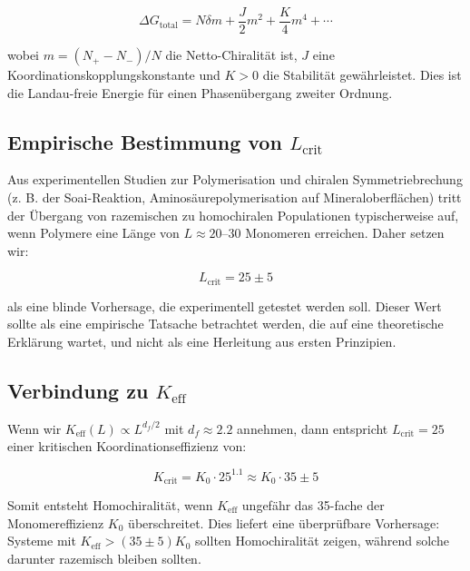 \documentclass[12pt,a4paper]{article}
\newcommand{\Keff}{K_{\mathrm{eff}}}
\newcommand{\df}{d_{\!f}}
\newcommand{\Kcrit}{K_{\mathrm{crit}}}
\begin{document}
	\begin{equation}
		\Delta G_{\text{total}} = N \delta m + \frac{J}{2} m^2 + \frac{K}{4} m^4 + \cdots
		\label{eq:chiral-free}
	\end{equation}
	
	wobei $m = (N_+ - N_-)/N$ die Netto-Chiralität ist, $J$ eine Koordinationskopplungskonstante und $K > 0$ die Stabilität gewährleistet. Dies ist die Landau-freie Energie für einen Phasenübergang zweiter Ordnung.
	
	\subsection{Empirische Bestimmung von \(L_{\text{crit}}\)}
	
	Aus experimentellen Studien zur Polymerisation und chiralen Symmetriebrechung (z. B. der Soai-Reaktion, Aminosäurepolymerisation auf Mineraloberflächen) tritt der Übergang von razemischen zu homochiralen Populationen typischerweise auf, wenn Polymere eine Länge von $L \approx 20$--$30$ Monomeren erreichen. Daher setzen wir:
	
	\begin{equation}
		\boxed{L_{\text{crit}} = 25 \pm 5}
		\label{eq:Lcrit-empirical}
	\end{equation}
	
	als eine blinde Vorhersage, die experimentell getestet werden soll. Dieser Wert sollte als eine empirische Tatsache betrachtet werden, die auf eine theoretische Erklärung wartet, und nicht als eine Herleitung aus ersten Prinzipien.
	
	\subsection{Verbindung zu \(\Keff\)}
	
	Wenn wir $\Keff(L) \propto L^{\df/2}$ mit $\df \approx 2.2$ annehmen, dann entspricht $L_{\text{crit}} = 25$ einer kritischen Koordinationseffizienz von:
	
	\begin{equation}
		\Kcrit = K_0 \cdot 25^{1.1} \approx K_0 \cdot 35 \pm 5
		\label{eq:Kcrit-from-L}
	\end{equation}
	
	Somit entsteht Homochiralität, wenn $\Keff$ ungefähr das 35-fache der Monomereffizienz $K_0$ überschreitet. Dies liefert eine überprüfbare Vorhersage: Systeme mit $\Keff > (35 \pm 5) K_0$ sollten Homochiralität zeigen, während solche darunter razemisch bleiben sollten.
	
\end{document}
